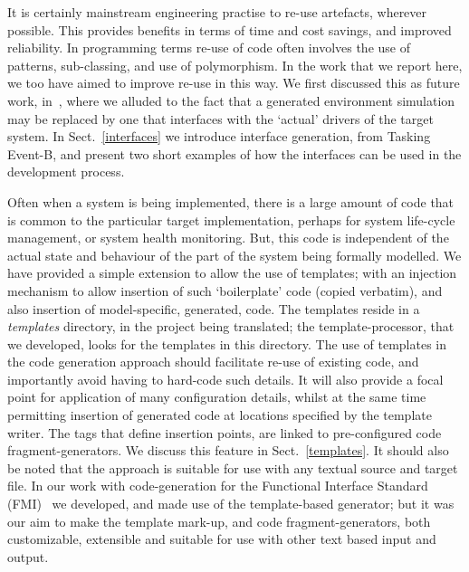 \documentclass{llncs}%
\begin{document}
It is certainly mainstream engineering practise to re-use artefacts, wherever possible. This provides benefits in terms of time and cost savings, and improved reliability. In programming terms re-use of code often involves the use of patterns, sub-classing, and use of polymorphism. In the work that we report here, we too have aimed to improve re-use in this way. We first discussed this as future work, in~\cite{ae2011a}, where we alluded to the fact that a generated environment simulation may be replaced by one that interfaces with the `actual' drivers of the target system. In Sect.~\ref{interfaces} we introduce interface generation, from Tasking Event-B, and present two short examples of how the interfaces can be used in the development process.

Often when a system is being implemented, there is a large amount of code that is common to the particular target implementation, perhaps for system life-cycle management, or system health monitoring. But, this code is independent of the actual state and behaviour of the part of the system being formally modelled. We have provided a simple extension to allow the use of templates; with an injection mechanism to allow insertion of  such `boilerplate' code (copied verbatim), and also insertion of model-specific, generated, code. The templates reside in a \emph{templates} directory, in the project being translated; the template-processor, that we developed, looks for the templates in this directory. The use of templates in the code generation approach should facilitate re-use of existing code, and importantly avoid having to hard-code such details. It will also provide a focal point for application of many configuration details, whilst at the same time permitting insertion of generated code at locations specified by the template writer. The tags that define insertion points, are linked to pre-configured code fragment-generators. We discuss this feature in Sect.~\ref{templates}. It should also be noted that the approach is suitable for use with any textual source and target file. In our work with code-generation for the Functional Interface Standard (FMI)~\cite{bloch2012,bloch2011,FMISTD} we developed, and made use of the template-based generator; but it was our aim to make the template mark-up, and code fragment-generators, both customizable, extensible and suitable for use with other text based input and output.  
%
\end{document}
